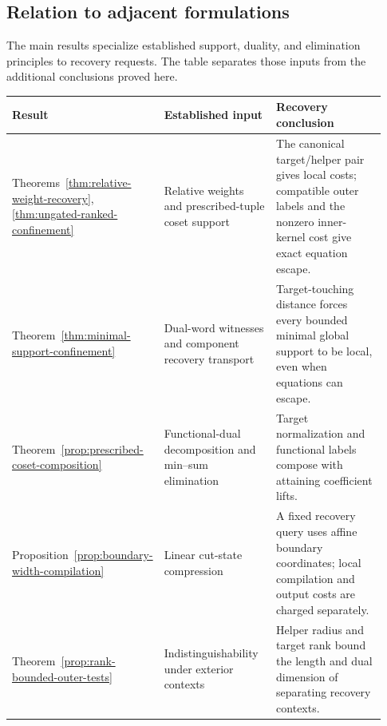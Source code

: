 \subsection{Relation to adjacent formulations}
\label{sec:related-work}

The main results specialize established support, duality, and elimination
principles to recovery requests.  The table separates those inputs from the
additional conclusions proved here.

\begin{center}
\small
\begin{tabular}{@{}>{\raggedright\arraybackslash}p{0.22\linewidth}>{\raggedright\arraybackslash}p{0.32\linewidth}>{\raggedright\arraybackslash}p{0.39\linewidth}@{}}
\toprule
Result & Established input & Recovery conclusion\\ \midrule
Theorems~\ref{thm:relative-weight-recovery}, \ref{thm:ungated-ranked-confinement}
& Relative weights and prescribed-tuple coset support
& The canonical target/helper pair gives local costs; compatible outer labels and the nonzero inner-kernel cost give exact equation escape.\\[3pt]
Theorem~\ref{thm:minimal-support-confinement}
& Dual-word witnesses and component recovery transport
& Target-touching distance forces every bounded minimal global support to be local, even when equations can escape.\\[3pt]
Theorem~\ref{prop:prescribed-coset-composition}
& Functional-dual decomposition and min--sum elimination
& Target normalization and functional labels compose with attaining coefficient lifts.\\[3pt]
Proposition~\ref{prop:boundary-width-compilation}
& Linear cut-state compression
& A fixed recovery query uses affine boundary coordinates; local compilation and output costs are charged separately.\\[3pt]
Theorem~\ref{prop:rank-bounded-outer-tests}
& Indistinguishability under exterior contexts
& Helper radius and target rank bound the length and dual dimension of separating recovery contexts.\\
\bottomrule
\end{tabular}
\end{center}

